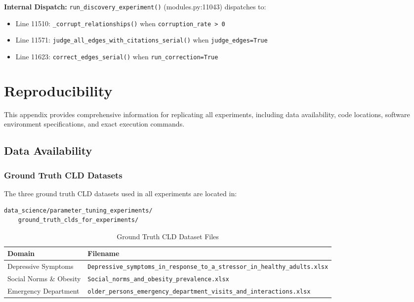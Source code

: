 \textbf{Internal Dispatch:} \texttt{run\_discovery\_experiment()} (modules.py:11043) dispatches to:
\begin{itemize}[noitemsep]
    \item Line 11510: \texttt{\_corrupt\_relationships()} when \texttt{corruption\_rate > 0}
    \item Line 11571: \texttt{judge\_all\_edges\_with\_citations\_serial()} when \texttt{judge\_edges=True}
    \item Line 11623: \texttt{correct\_edges\_serial()} when \texttt{run\_correction=True}
\end{itemize}

\section{Reproducibility}
\label{sec:reproducibility}

This appendix provides comprehensive information for replicating all experiments, including data availability, code locations, software environment specifications, and exact execution commands.

\subsection{Data Availability}
\label{sec:data_availability}

\subsubsection{Ground Truth CLD Datasets}

The three ground truth CLD datasets used in all experiments are located in:
\begin{verbatim}
data_science/parameter_tuning_experiments/
    ground_truth_clds_for_experiments/
\end{verbatim}

\begin{table}[H]
\centering
\caption{Ground Truth CLD Dataset Files}
\label{tab:gt_files}
\footnotesize
\begin{tabular}{@{}ll@{}}
\toprule
\textbf{Domain} & \textbf{Filename} \\
\midrule
Depressive Symptoms & \texttt{Depressive\_symptoms\_in\_response\_to\_a\_stressor\_in\_healthy\_adults.xlsx} \\
Social Norms \& Obesity & \texttt{Social\_norms\_and\_obesity\_prevalence.xlsx} \\
Emergency Department & \texttt{older\_persons\_emergency\_department\_visits\_and\_interactions.xlsx} \\
\bottomrule
\end{tabular}
\end{table}

